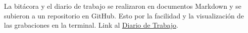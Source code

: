 La bitácora y el diario de trabajo se realizaron en documentos Markdown y se subieron a un repositorio en GitHub. Esto por la facilidad y la visualización de las grabaciones en la terminal. Link al \href{https://github.com/DSarceno/Simulation-Lab/blob/main/Practicas/Diario.md}{Diario de Trabajo}.